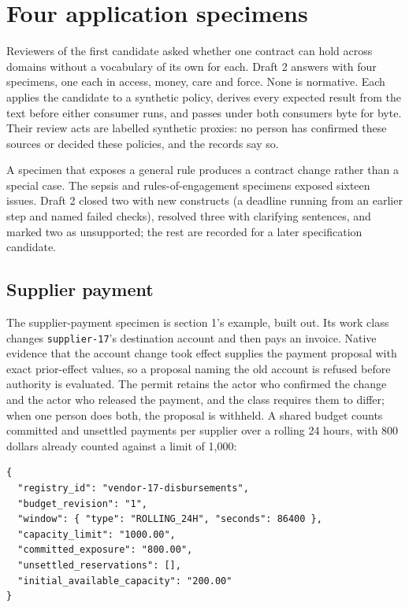 \documentclass[
  american,
  11pt,
  letterpaper,
]{article}
\newcommand{\passthrough}[1]{#1}
\begin{document}
\section{Four application specimens}\label{four-application-specimens}

Reviewers of the first candidate asked whether one contract can hold
across domains without a vocabulary of its own for each. Draft 2 answers
with four specimens, one each in access, money, care and force. None is
normative. Each applies the candidate to a synthetic policy, derives
every expected result from the text before either consumer runs, and
passes under both consumers byte for byte. Their review acts are
labelled synthetic proxies: no person has confirmed these sources or
decided these policies, and the records say so.

A specimen that exposes a general rule produces a contract change rather
than a special case. The sepsis and rules-of-engagement specimens
exposed sixteen issues. Draft 2 closed two with new constructs (a
deadline running from an earlier step and named failed checks), resolved
three with clarifying sentences, and marked two as unsupported; the rest
are recorded for a later specification candidate.

\subsection{Supplier payment}\label{supplier-payment}

The supplier-payment specimen is section 1's example, built out. Its
work class changes \passthrough{\lstinline!supplier-17!}'s destination
account and then pays an invoice. Native evidence that the account
change took effect supplies the payment proposal with exact prior-effect
values, so a proposal naming the old account is refused before authority
is evaluated. The permit retains the actor who confirmed the change and
the actor who released the payment, and the class requires them to
differ; when one person does both, the proposal is withheld. A shared
budget counts committed and unsettled payments per supplier over a
rolling 24 hours, with 800 dollars already counted against a limit of
1,000:

\begin{lstlisting}
{
  "registry_id": "vendor-17-disbursements",
  "budget_revision": "1",
  "window": { "type": "ROLLING_24H", "seconds": 86400 },
  "capacity_limit": "1000.00",
  "committed_exposure": "800.00",
  "unsettled_reservations": [],
  "initial_available_capacity": "200.00"
}
\end{lstlisting}
\end{document}
